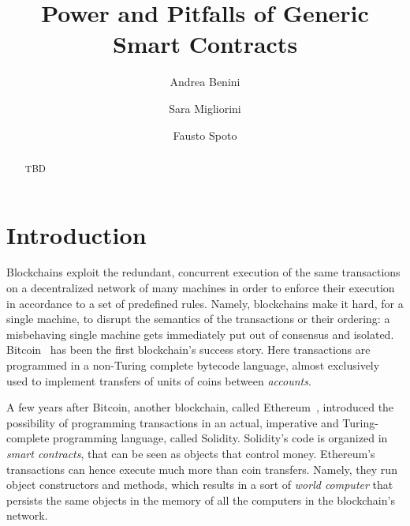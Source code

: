 \documentclass{llncs}
\begin{document}
\title{Power and Pitfalls of Generic Smart Contracts}
\author{Andrea Benini \and Sara Migliorini \and Fausto Spoto}

\maketitle

\begin{abstract}
  TBD
\end{abstract}

\section{Introduction}\label{sec:introduction}

Blockchains exploit the redundant, concurrent execution of the same
transactions on a decentralized network of many machines
in order to enforce their execution in accordance to
a set of predefined rules. Namely, blockchains make it hard, for a single machine,
to disrupt the semantics of the transactions or their ordering: a misbehaving single machine
gets immediately put out of consensus and isolated. Bitcoin~\cite{Nakamoto08,book-mastering-bitcoin}
has been the first blockchain's success story. Here
transactions are programmed in a non-Turing complete bytecode language,
almost exclusively used to implement transfers of units of coins between \emph{accounts}.

A few years after Bitcoin, another blockchain, called
Ethereum~\cite{Buterin13,AntonopoulosW18}, introduced the possibility of programming
transactions in an actual, imperative and Turing-complete programming language, called Solidity.
Solidity's code is organized in \emph{smart contracts}, that can be seen as
objects that control money.
Ethereum's transactions can hence execute much more than coin transfers. Namely,
they run object constructors and methods, which results in a sort
of \emph{world computer} that persists the same objects in the memory of all the
computers in the blockchain's network.
\end{document}
